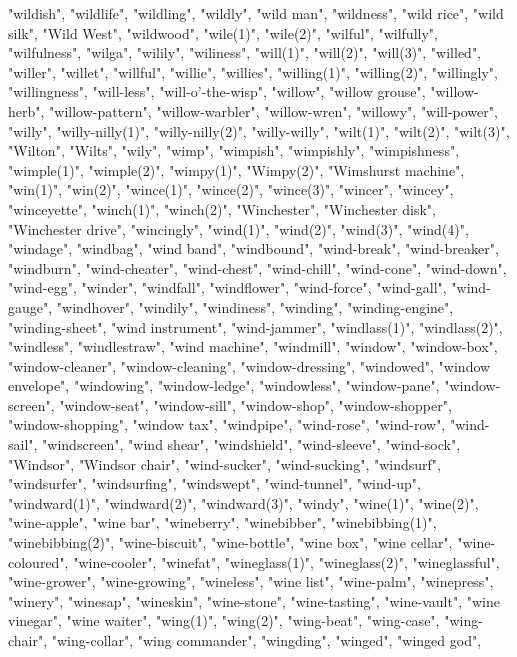 "wildish",
"wildlife",
"wildling",
"wildly",
"wild man",
"wildness",
"wild rice",
"wild silk",
"Wild West",
"wildwood",
"wile(1)",
"wile(2)",
"wilful",
"wilfully",
"wilfulness",
"wilga",
"wilily",
"wiliness",
"will(1)",
"will(2)",
"will(3)",
"willed",
"willer",
"willet",
"willful",
"willie",
"willies",
"willing(1)",
"willing(2)",
"willingly",
"willingness",
"will-less",
"will-o'-the-wisp",
"willow",
"willow grouse",
"willow-herb",
"willow-pattern",
"willow-warbler",
"willow-wren",
"willowy",
"will-power",
"willy",
"willy-nilly(1)",
"willy-nilly(2)",
"willy-willy",
"wilt(1)",
"wilt(2)",
"wilt(3)",
"Wilton",
"Wilts",
"wily",
"wimp",
"wimpish",
"wimpishly",
"wimpishness",
"wimple(1)",
"wimple(2)",
"wimpy(1)",
"Wimpy(2)",
"Wimshurst machine",
"win(1)",
"win(2)",
"wince(1)",
"wince(2)",
"wince(3)",
"wincer",
"wincey",
"winceyette",
"winch(1)",
"winch(2)",
"Winchester",
"Winchester disk",
"Winchester drive",
"wincingly",
"wind(1)",
"wind(2)",
"wind(3)",
"wind(4)",
"windage",
"windbag",
"wind band",
"windbound",
"wind-break",
"wind-breaker",
"windburn",
"wind-cheater",
"wind-chest",
"wind-chill",
"wind-cone",
"wind-down",
"wind-egg",
"winder",
"windfall",
"windflower",
"wind-force",
"wind-gall",
"wind-gauge",
"windhover",
"windily",
"windiness",
"winding",
"winding-engine",
"winding-sheet",
"wind instrument",
"wind-jammer",
"windlass(1)",
"windlass(2)",
"windless",
"windlestraw",
"wind machine",
"windmill",
"window",
"window-box",
"window-cleaner",
"window-cleaning",
"window-dressing",
"windowed",
"window envelope",
"windowing",
"window-ledge",
"windowless",
"window-pane",
"window-screen",
"window-seat",
"window-sill",
"window-shop",
"window-shopper",
"window-shopping",
"window tax",
"windpipe",
"wind-rose",
"wind-row",
"wind-sail",
"windscreen",
"wind shear",
"windshield",
"wind-sleeve",
"wind-sock",
"Windsor",
"Windsor chair",
"wind-sucker",
"wind-sucking",
"windsurf",
"windsurfer",
"windsurfing",
"windswept",
"wind-tunnel",
"wind-up",
"windward(1)",
"windward(2)",
"windward(3)",
"windy",
"wine(1)",
"wine(2)",
"wine-apple",
"wine bar",
"wineberry",
"winebibber",
"winebibbing(1)",
"winebibbing(2)",
"wine-biscuit",
"wine-bottle",
"wine box",
"wine cellar",
"wine-coloured",
"wine-cooler",
"winefat",
"wineglass(1)",
"wineglass(2)",
"wineglassful",
"wine-grower",
"wine-growing",
"wineless",
"wine list",
"wine-palm",
"winepress",
"winery",
"winesap",
"wineskin",
"wine-stone",
"wine-tasting",
"wine-vault",
"wine vinegar",
"wine waiter",
"wing(1)",
"wing(2)",
"wing-beat",
"wing-case",
"wing-chair",
"wing-collar",
"wing commander",
"wingding",
"winged",
"winged god",
